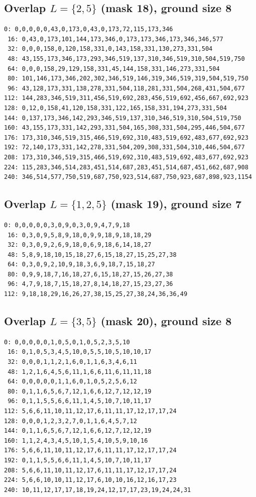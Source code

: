 \documentclass[11pt]{article}
\begin{document}
\subsection*{Overlap $L=\{2,5\}$ (mask 18), ground size 8}
\begin{Verbatim}[fontsize=\footnotesize]
  0: 0,0,0,0,0,43,0,173,0,43,0,173,72,115,173,346
 16: 0,43,0,173,101,144,173,346,0,173,173,346,173,346,346,577
 32: 0,0,0,158,0,120,158,331,0,143,158,331,130,273,331,504
 48: 43,155,173,346,173,293,346,519,137,310,346,519,310,504,519,750
 64: 0,0,0,158,29,129,158,331,45,144,158,331,146,273,331,504
 80: 101,146,173,346,202,302,346,519,146,319,346,519,319,504,519,750
 96: 43,128,173,331,138,278,331,504,118,281,331,504,268,431,504,677
112: 144,283,346,519,311,456,519,692,283,456,519,692,456,667,692,923
128: 0,12,0,158,41,120,158,331,122,165,158,331,194,273,331,504
144: 0,137,173,346,142,293,346,519,137,310,346,519,310,504,519,750
160: 43,155,173,331,142,293,331,504,165,308,331,504,295,446,504,677
176: 173,310,346,519,315,466,519,692,310,483,519,692,483,677,692,923
192: 72,140,173,331,142,278,331,504,209,308,331,504,310,446,504,677
208: 173,310,346,519,315,466,519,692,310,483,519,692,483,677,692,923
224: 115,283,346,514,283,451,514,687,283,451,514,687,451,662,687,908
240: 346,514,577,750,519,687,750,923,514,687,750,923,687,898,923,1154
\end{Verbatim}
\subsection*{Overlap $L=\{1,2,5\}$ (mask 19), ground size 7}
\begin{Verbatim}[fontsize=\footnotesize]
  0: 0,0,0,0,0,3,0,9,0,3,0,9,4,7,9,18
 16: 0,3,0,9,5,8,9,18,0,9,9,18,9,18,18,29
 32: 0,3,0,9,2,6,9,18,0,6,9,18,6,14,18,27
 48: 5,8,9,18,10,15,18,27,6,15,18,27,15,25,27,38
 64: 0,3,0,9,2,10,9,18,3,6,9,18,7,15,18,27
 80: 0,9,9,18,7,16,18,27,6,15,18,27,15,26,27,38
 96: 4,7,9,18,7,15,18,27,8,14,18,27,15,23,27,36
112: 9,18,18,29,16,26,27,38,15,25,27,38,24,36,36,49
\end{Verbatim}
\subsection*{Overlap $L=\{3,5\}$ (mask 20), ground size 8}
\begin{Verbatim}[fontsize=\footnotesize]
  0: 0,0,0,0,0,1,0,5,0,1,0,5,2,3,5,10
 16: 0,1,0,5,3,4,5,10,0,5,5,10,5,10,10,17
 32: 0,0,0,1,1,2,1,6,0,1,1,6,3,4,6,11
 48: 1,2,1,6,4,5,6,11,1,6,6,11,6,11,11,18
 64: 0,0,0,0,0,1,1,6,0,1,0,5,2,5,6,12
 80: 0,1,1,6,5,6,7,12,1,6,6,12,7,12,12,19
 96: 0,1,1,5,5,6,6,11,1,4,5,10,7,10,11,17
112: 5,6,6,11,10,11,12,17,6,11,11,17,12,17,17,24
128: 0,0,0,1,2,3,2,7,0,1,1,6,4,5,7,12
144: 0,1,1,6,5,6,7,12,1,6,6,12,7,12,12,19
160: 1,1,2,4,3,4,5,10,1,5,4,10,5,9,10,16
176: 5,6,6,11,10,11,12,17,6,11,11,17,12,17,17,24
192: 0,1,1,5,5,6,6,11,1,4,5,10,7,10,11,17
208: 5,6,6,11,10,11,12,17,6,11,11,17,12,17,17,24
224: 5,6,6,10,10,11,12,17,6,10,10,16,12,16,17,23
240: 10,11,12,17,17,18,19,24,12,17,17,23,19,24,24,31
\end{Verbatim}
\end{document}
